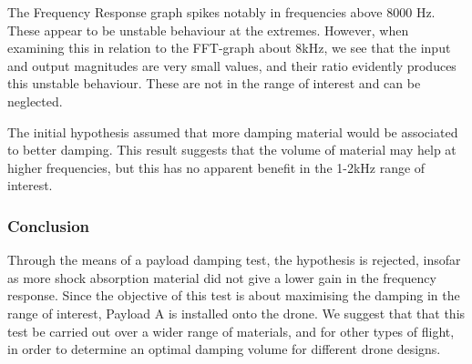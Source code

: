 The Frequency Response graph spikes notably in frequencies above 8000 Hz. These appear to be unstable behaviour at the extremes. However, when examining this in relation to the FFT-graph about 8kHz, we see that the input and output magnitudes are very small values, and their ratio evidently produces this unstable behaviour. These are not in the range of interest and can be neglected. 

The initial hypothesis assumed that more damping material would be associated to better damping. This result suggests that the volume of material may help at higher frequencies, but this has no apparent benefit in the 1-2kHz range of interest. 



\subsubsection{ Conclusion}

Through the means of a payload damping test, the hypothesis is rejected, insofar as more shock absorption material did not give a lower gain in the frequency response. Since the objective of this test is about maximising the damping in the range of interest, Payload A is installed onto the drone. We suggest that that this test be carried out over a wider range of materials, and for other types of flight, in order to determine an optimal damping volume for different drone designs.






    

